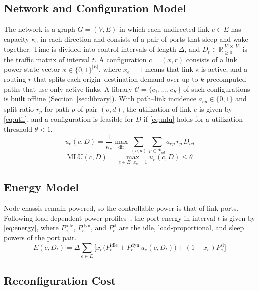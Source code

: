 \documentclass[journal]{IEEEtran}
\begin{document}
\subsection{Network and Configuration Model}

The network is a graph $G=(V,E)$ in which each undirected link $e\in E$ has capacity $\kappa_e$ in each direction and consists of a pair of ports that sleep and wake together. Time is divided into control intervals of length $\Delta$, and $D_t\in\mathbb{R}_{\ge 0}^{|V|\times|V|}$ is the traffic matrix of interval $t$. A configuration $c=(x,r)$ consists of a link power-state vector $x\in\{0,1\}^{|E|}$, where $x_e=1$ means that link $e$ is active, and a routing $r$ that splits each origin--destination demand over up to $k$ precomputed paths that use only active links. A library $\mathcal{C}=\{c_1,\dots,c_K\}$ of such configurations is built offline (Section~\ref{sec:library}). With path--link incidence $a_{ep}\in\{0,1\}$ and split ratio $r_p$ for path $p$ of pair $(o,d)$, the utilization of link $e$ is given by \eqref{eq:util}, and a configuration is feasible for $D$ if \eqref{eq:mlu} holds for a utilization threshold $\theta<1$.
\begin{equation}\label{eq:util}
u_e(c,D)=\frac{1}{\kappa_e}\max_{\text{dir}}\sum_{(o,d)}\sum_{p\in\mathcal{P}_{od}} a_{ep}\,r_p\,D_{od}
\end{equation}
\begin{equation}\label{eq:mlu}
\mathrm{MLU}(c,D)=\max_{e\in E:\,x_e=1}u_e(c,D)\le\theta
\end{equation}

\subsection{Energy Model}

Node chassis remain powered, so the controllable power is that of link ports. Following load-dependent power profiles~\cite{restrepo2009energy,mahadevan2009power,vishwanath2014modeling}, the port energy in interval $t$ is given by \eqref{eq:energy}, where $P^{\mathrm{idle}}_e$, $P^{\mathrm{dyn}}_e$, and $P^{\mathrm{sl}}_e$ are the idle, load-proportional, and sleep powers of the port pair.
\begin{equation}\label{eq:energy}
E(c,D_t)=\Delta\sum_{e\in E}\Big[x_e\big(P^{\mathrm{idle}}_e+P^{\mathrm{dyn}}_e\,u_e(c,D_t)\big)+(1-x_e)P^{\mathrm{sl}}_e\Big]
\end{equation}

\subsection{Reconfiguration Cost}
\end{document}
